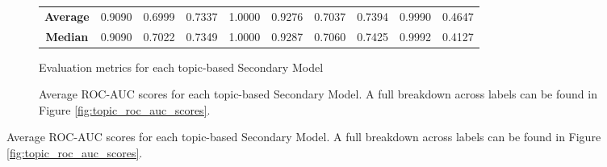 \begin{figure}[ht]
\begin{subfigure}[ht]{\textwidth}
{\begin{tabular}{cccccccccc}
                \midrule
                \textbf{Average}  & 0.9090                                        & 0.6999                                         & 0.7337                      & 1.0000               & 0.9276             & 0.7037          & 0.7394             & 0.9990               & 0.4647          \\
                \textbf{Median}   & 0.9090                                        & 0.7022                                         & 0.7349                      & 1.0000               & 0.9287             & 0.7060          & 0.7425             & 0.9992               & 0.4127          \\
                \bottomrule
            \end{tabular}%
        }
        \caption{Evaluation metrics for each topic-based Secondary Model}
        \label{subfig:topic_evaluation_metrics}
    \end{subfigure}

    \vspace{5pt}

    \begin{subfigure}[ht]{\textwidth}
        \centering
        \caption{Average ROC-AUC scores for each topic-based Secondary Model. A full breakdown across labels can be found in Figure \ref{fig:topic_roc_auc_scores}.}
        \label{subfig:topic_roc_auc}
    \end{subfigure}


\end{figure}
